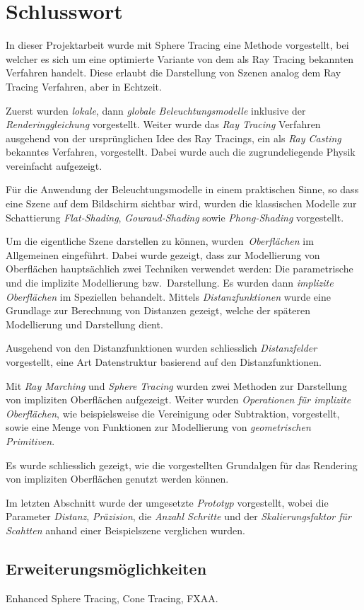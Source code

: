 
\chapter{Schlusswort}
\label{chap:discussion_and_conclusion}

In dieser Projektarbeit wurde mit Sphere Tracing eine Methode
vorgestellt, bei welcher es sich um eine optimierte Variante von dem als
Ray Tracing bekannten Verfahren handelt. Diese erlaubt die Darstellung
von Szenen analog dem Ray Tracing Verfahren, aber in Echtzeit.

Zuerst wurden \textit{lokale}, dann \textit{globale Beleuchtungsmodelle} inklusive der
\textit{Renderinggleichung} vorgestellt. Weiter wurde das \textit{Ray Tracing}
Verfahren ausgehend von der ursprünglichen Idee des Ray Tracings, ein
als \textit{Ray Casting} bekanntes Verfahren, vorgestellt. Dabei wurde auch die
zugrundeliegende Physik vereinfacht aufgezeigt.

Für die Anwendung der Beleuchtungsmodelle in einem praktischen Sinne, so
dass eine Szene auf dem Bildschirm sichtbar wird, wurden die klassischen
Modelle zur Schattierung \textit{Flat-Shading}, \textit{Gouraud-Shading}
sowie \textit{Phong-Shading} vorgestellt.

Um die eigentliche Szene darstellen zu können,
wurden~\textit{Oberflächen} im Allgemeinen eingeführt. Dabei wurde
gezeigt, dass zur Modellierung von Oberflächen hauptsächlich zwei
Techniken verwendet werden: Die parametrische und die
implizite Modellierung bzw.\ Darstellung. Es wurden dann
\textit{implizite Oberflächen} im Speziellen behandelt. Mittels
\textit{Distanzfunktionen} wurde eine Grundlage zur Berechnung von
Distanzen gezeigt, welche der späteren Modellierung und Darstellung dient.

Ausgehend von den Distanzfunktionen wurden schliesslich
\textit{Distanzfelder} vorgestellt, eine Art Datenstruktur basierend auf
den Distanzfunktionen.

Mit \textit{Ray Marching} und \textit{Sphere Tracing} wurden zwei Methoden
zur Darstellung von impliziten Oberflächen aufgezeigt. Weiter wurden
\textit{Operationen für implizite Oberflächen}, wie beispielsweise die
Vereinigung oder Subtraktion, vorgestellt, sowie eine Menge von
Funktionen zur Modellierung von \textit{geometrischen Primitiven}.

Es wurde schliesslich gezeigt, wie die vorgestellten Grundalgen für das
Rendering von impliziten Oberflächen genutzt werden können.

Im letzten Abschnitt wurde der umgesetzte \textit{Prototyp} vorgestellt,
wobei die Parameter \textit{Distanz}, \textit{Präzision}, die
\textit{Anzahl Schritte} und der \textit{Skalierungsfaktor für Scahtten}
anhand einer Beispielszene verglichen wurden.

\section{Erweiterungsmöglichkeiten}
\label{sec:further_work}

Enhanced Sphere Tracing, Cone Tracing, FXAA.\
